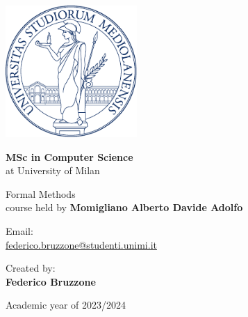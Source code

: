 \documentclass[a4paper]{article}
\begin{document}


\begin{titlepage}
    \begin{center}
        \includegraphics[height=5cm]{minerva.pdf} %

        \vspace*{1.75cm}

        \LARGE


        \textbf{MSc in Computer Science} \\
        at University of Milan

        \vspace*{1cm}


        \huge
        Formal Methods\\

        \large course held by \textbf{Momigliano Alberto Davide Adolfo}


        \normalsize
        \vspace*{4cm}

        \begin{minipage}[t]{0.47\textwidth}
	       {Email: } \vspace{0.3em} \\
              {\large \href{federico.bruzzone@studenti.unimi.it}{federico.bruzzone@studenti.unimi.it}} \vspace{1em}  \\
        \end{minipage}
        \hfill
        \begin{minipage}[t]{0.47\textwidth}\raggedleft
	       {Created by:} \hspace{-0.9em} \vspace{0.3em} \\
              {\large \textbf{Federico Bruzzone}} \\
              \vspace{1em}
        \end{minipage}

        \vfill
        Academic year of 2023/2024

    \end{center}
\end{titlepage}
\end{document}
